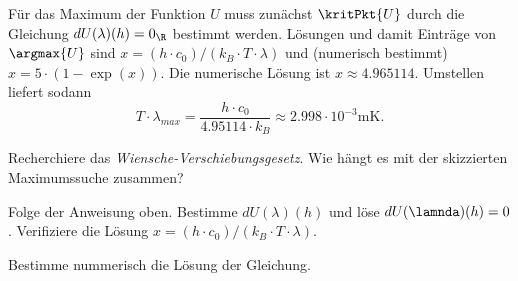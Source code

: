 \documentclass{article}
\begin{document}
    Für das Maximum der Funktion $U$ muss zunächst $\kritPkt{U}$ durch die Gleichung $dU(\lambda)(h) = 0_\R$ bestimmt werden. Lösungen und damit Einträge von $\argmax{U}$ sind $x=(h\cdot c_0)/(k_B\cdot T\cdot\lambda)$ und (numerisch bestimmt) $x = 5\cdot (1-\exp(x))$. Die numerische Lösung ist $x\approx 4.965114$. Umstellen liefert sodann 
    \[T\cdot\lambda_\textit{max} = \frac{h\cdot c_0}{4.95114\cdot k_B}\approx 2.998\cdot 10^{-3}\si{\metre\kelvin}.\]

    \begin{Aufgabe}
        \nr{} Recherchiere das \emph{Wiensche-Verschiebungsgesetz}. Wie hängt es mit der skizzierten Maximumssuche zusammen?

        \nr{} Folge der Anweisung oben. Bestimme $dU(\lambda)(h)$ und löse $dU(\lamnda)(h) = 0$. Verifiziere die Lösung $x=(h\cdot c_0)/(k_B\cdot T\cdot\lambda)$. 

        \nr{} Bestimme nummerisch die Lösung der Gleichung. 
    \end{Aufgabe}
\end{document}
